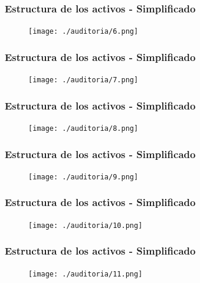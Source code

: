 \documentclass{beamer}
\begin{document}
\begin{frame}[c,fragile]
	\frametitle{Estructura de los activos - Simplificado}
	\begin{figure}[H]
		\centering
		\texttt{[image: ./auditoria/6.png]}\\
	\end{figure}
\end{frame}

\begin{frame}[c,fragile]
	\frametitle{Estructura de los activos - Simplificado}
	\begin{figure}[H]
		\centering
		\texttt{[image: ./auditoria/7.png]}\\
	\end{figure}
\end{frame}

\begin{frame}[c,fragile]
	\frametitle{Estructura de los activos - Simplificado}
	\begin{figure}[H]
		\centering
		\texttt{[image: ./auditoria/8.png]}\\
	\end{figure}
\end{frame}

\begin{frame}[c,fragile]
	\frametitle{Estructura de los activos - Simplificado}
	\begin{figure}[H]
		\centering
		\texttt{[image: ./auditoria/9.png]}\\
	\end{figure}
\end{frame}

\begin{frame}[c,fragile]
	\frametitle{Estructura de los activos - Simplificado}
	\begin{figure}[H]
		\centering
		\texttt{[image: ./auditoria/10.png]}\\
	\end{figure}
\end{frame}

\begin{frame}[c,fragile]
	\frametitle{Estructura de los activos - Simplificado}
	\begin{figure}[H]
		\centering
		\texttt{[image: ./auditoria/11.png]}\\
	\end{figure}
\end{frame}
\end{document}
